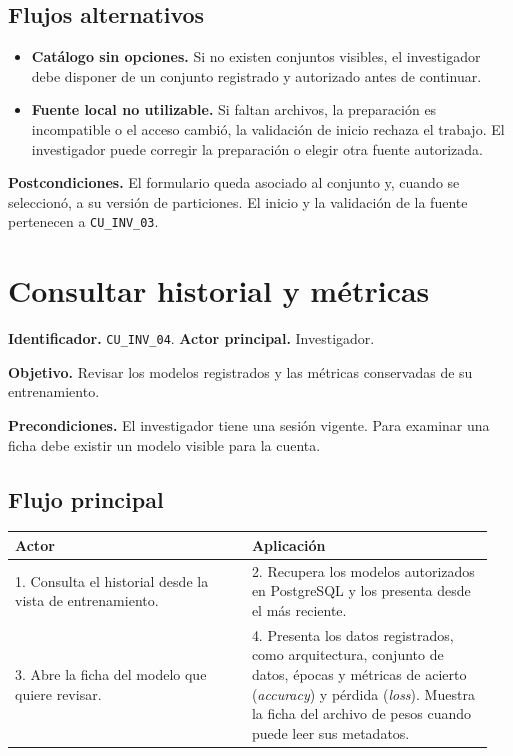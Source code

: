 \subsection*{Flujos alternativos}

\begin{itemize}
    \item \textbf{Catálogo sin opciones.} Si no existen conjuntos
    visibles, el investigador debe disponer de un conjunto registrado
    y autorizado antes de continuar.
    \item \textbf{Fuente local no utilizable.} Si faltan archivos,
    la preparación es incompatible o el acceso cambió, la validación
    de inicio rechaza el trabajo. El investigador puede corregir la
    preparación o elegir otra fuente autorizada.
\end{itemize}

\noindent\textbf{Postcondiciones.} El formulario queda asociado al
conjunto y, cuando se seleccionó, a su versión de particiones. El
inicio y la validación de la fuente pertenecen a \texttt{CU\_INV\_03}.

\section{Consultar historial y métricas}
\label{cu:inv-04}

\noindent\textbf{Identificador.} \texttt{CU\_INV\_04}.
\textbf{Actor principal.} Investigador.

\noindent\textbf{Objetivo.} Revisar los modelos registrados y las
métricas conservadas de su entrenamiento.

\noindent\textbf{Precondiciones.} El investigador tiene una sesión
vigente. Para examinar una ficha debe existir un modelo visible para
la cuenta.

\subsection*{Flujo principal}

\noindent
\begin{tabular}{@{}p{0.47\linewidth}p{0.48\linewidth}@{}}
    \hline
    \textbf{Actor} & \textbf{Aplicación} \\
    \hline
    1. Consulta el historial desde la vista de entrenamiento. &
    2. Recupera los modelos autorizados en PostgreSQL y los presenta desde el más reciente. \\
    3. Abre la ficha del modelo que quiere revisar. &
    4. Presenta los datos registrados, como arquitectura, conjunto de datos, épocas y métricas de acierto (\emph{accuracy}) y pérdida (\emph{loss}). Muestra la ficha del archivo de pesos cuando puede leer sus metadatos. \\
    \hline
\end{tabular}

